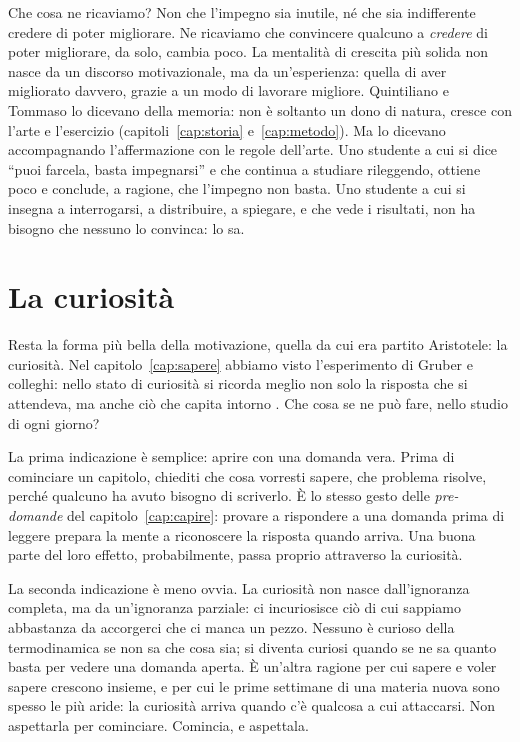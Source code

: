 Che cosa ne ricaviamo? Non che l'impegno sia inutile, né che sia
indifferente credere di poter migliorare. Ne ricaviamo che convincere
qualcuno a \emph{credere} di poter migliorare, da solo, cambia poco. La
mentalità di crescita più solida non nasce da un discorso motivazionale,
ma da un'esperienza: quella di aver migliorato davvero, grazie a un
modo di lavorare migliore. Quintiliano e Tommaso lo dicevano della
memoria: non è soltanto un dono di natura, cresce con l'arte e
l'esercizio (capitoli~\ref{cap:storia} e~\ref{cap:metodo}). Ma lo dicevano accompagnando
l'affermazione con le regole dell'arte. Uno studente a cui si dice
\enquote{puoi farcela, basta impegnarsi} e che continua a studiare
rileggendo, ottiene poco e conclude, a ragione, che l'impegno non basta.
Uno studente a cui si insegna a interrogarsi, a distribuire, a
spiegare, e che vede i risultati, non ha bisogno che nessuno lo
convinca: lo sa.

\section{La curiosità}

Resta la forma più bella della motivazione, quella da cui era partito
Aristotele: la curiosità. Nel capitolo~\ref{cap:sapere} abbiamo visto
l'esperimento di Gruber e colleghi: nello stato di curiosità si ricorda
meglio non solo la risposta che si attendeva, ma anche ciò che capita
intorno \parencite{gruber2014}. Che cosa se ne può fare, nello studio
di ogni giorno?

La prima indicazione è semplice: aprire con una domanda vera. Prima di
cominciare un capitolo, chiediti che cosa vorresti sapere, che problema
risolve, perché qualcuno ha avuto bisogno di scriverlo. È lo stesso
gesto delle \emph{pre-domande} del capitolo~\ref{cap:capire}: provare
a rispondere a una domanda prima di leggere prepara la mente a
riconoscere la risposta quando arriva. Una buona parte del loro
effetto, probabilmente, passa proprio attraverso la curiosità.

La seconda indicazione è meno ovvia. La curiosità non nasce
dall'ignoranza completa, ma da un'ignoranza parziale: ci incuriosisce
ciò di cui sappiamo abbastanza da accorgerci che ci manca un pezzo.
Nessuno è curioso della termodinamica se non sa che cosa sia; si
diventa curiosi quando se ne sa quanto basta per vedere una domanda
aperta. È un'altra ragione per cui sapere e voler sapere crescono
insieme, e per cui le prime settimane di una materia nuova sono spesso
le più aride: la curiosità arriva quando c'è qualcosa a cui attaccarsi.
Non aspettarla per cominciare. Comincia, e aspettala.

